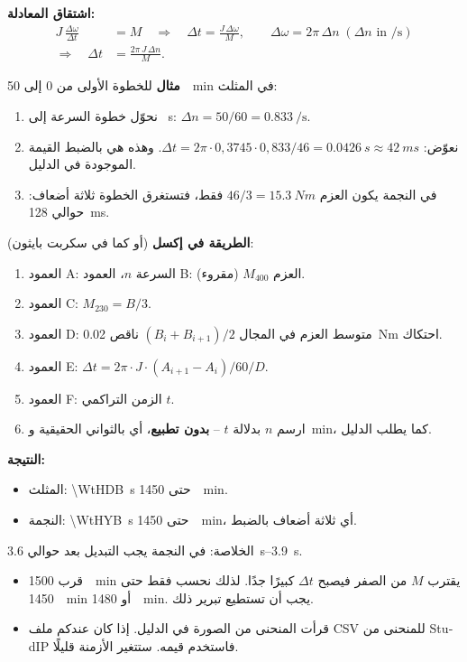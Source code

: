\documentclass[11pt,a4paper]{article}
\newcommand{\dt}[1]{\textgerman{#1}}
\begin{document}
\textbf{اشتقاق المعادلة:}
\begin{align*}
J\,\frac{\Delta\omega}{\Delta t} &= M
\quad\Rightarrow\quad \Delta t = \frac{J\,\Delta\omega}{M},
\qquad \Delta\omega = 2\pi\,\Delta n\;(\Delta n \text{ in } \si{\per\second})\\
\Rightarrow\quad \Delta t &= \frac{2\pi\,J\,\Delta n}{M}.
\end{align*}

\textbf{مثال} للخطوة الأولى من 0 إلى \SI{50}{\per\minute} في المثلث:
\begin{enumerate}
\item نحوّل خطوة السرعة إلى \si{\per\second}: $\Delta n = 50/60 = \SI{0,833}{\per\second}$.
\item نعوّض: $\Delta t = 2\pi\cdot0{,}3745\cdot0{,}833/46 = \SI{0,0426}{s}\approx\SI{42}{ms}$.
      وهذه هي بالضبط القيمة الموجودة في الدليل.
\item في النجمة يكون العزم $46/3 = \SI{15,3}{Nm}$ فقط، فتستغرق الخطوة ثلاثة أضعاف: حوالي \SI{128}{ms}.
\end{enumerate}

\textbf{الطريقة في إكسل} (أو كما في سكربت بايثون):
\begin{enumerate}
\item العمود A: السرعة $n$، العمود B: العزم $M_{400}$ (مقروء).
\item العمود C: $M_{230} = B/3$.
\item العمود D: متوسط العزم في المجال $(B_i+B_{i+1})/2$ ناقص \SI{0,02}{Nm} احتكاك.
\item العمود E: $\Delta t = 2\pi\cdot J\cdot(A_{i+1}-A_i)/60/D$.
\item العمود F: الزمن التراكمي $t$.
\item ارسم $n$ بدلالة $t$ – \textbf{بدون تطبيع}، أي بالثواني الحقيقية و\si{\per\minute}، كما يطلب الدليل.
\end{enumerate}

\textbf{النتيجة:}
\begin{itemize}
\item المثلث: \SI{\WtHDB}{s} حتى \SI{1450}{\per\minute}.
\item النجمة: \SI{\WtHYB}{s} حتى \SI{1450}{\per\minute}، أي ثلاثة أضعاف بالضبط.
\end{itemize}
الخلاصة: في النجمة يجب التبديل بعد حوالي \SIrange{3,6}{3,9}{s}.

\begin{achtung}
\begin{itemize}
\item قرب \SI{1500}{\per\minute} يقترب $M$ من الصفر فيصبح $\Delta t$ كبيرًا جدًا. لذلك نحسب فقط حتى
      \SI{1450}{\per\minute} أو \SI{1480}{\per\minute}. يجب أن تستطيع تبرير ذلك.
\item قرأت المنحنى من الصورة في الدليل. إذا كان عندكم ملف \dt{CSV} للمنحنى من \dt{StudIP}
      فاستخدم قيمه. ستتغير الأزمنة قليلًا.
\end{itemize}
\end{achtung}
\end{document}
